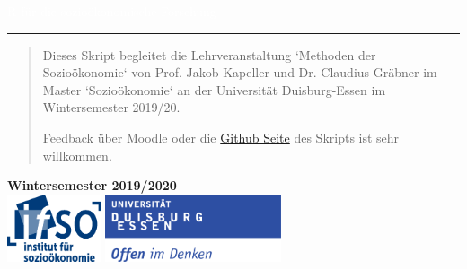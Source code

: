 \documentclass[letterpaper]{article}
\author{%
    Dr. Claudius Gräbner \\
    Institut für Sozioökonomie \\
    Universität Duisburg-Essen\\
    \href{mailto:claudius.graebner@uni-due.com}{claudius.graebner@uni-due.com}\\
    \href{www.claudius-graebner.com}{https://claudius-graebner.com/}
    }
\makeatletter
\def\printauthor{%
    {\large \@author}}
\makeatother
\begin{document}
\begin{titlepage}
\BgThispage
{}
\vspace*{2cm}
\noindent
\textcolor{white}{\bigsf R für die \mbox{sozioökonomische} Forschung}
\vspace*{3.0cm}\par
\noindent
\begin{minipage}{0.35\linewidth}
    \begin{flushright}
        \printauthor
    \end{flushright}
\end{minipage} \hspace{15pt}
%
\begin{minipage}{0.02\linewidth}
    \rule{1pt}{175pt}
\end{minipage} \hspace{-10pt}
%
\begin{minipage}{0.6\linewidth}
\vspace{5pt}
    \begin{abstract} 
Dieses Skript begleitet die Lehrveranstaltung `Methoden der Sozioökonomie` von Prof. Jakob Kapeller und Dr. Claudius Gräbner im Master `Sozioökonomie` an der Universität Duisburg-Essen im Wintersemester 2019/20.

Feedback über Moodle oder die \href{https://github.com/graebnerc/RforSocioEcon}{Github Seite} des Skripts ist sehr willkommen.
    \end{abstract}
\end{minipage}

\vspace{0.25cm}
\centering
\vspace{1.25cm}
\textbf{Wintersemester 2019/2020}\\
\vfill
\includegraphics[height=2cm]{ifso_logo_dt_RGB} \hspace{2cm}
\includegraphics[height=2cm]{logo_ude.pdf}
\end{titlepage}
\end{document}
